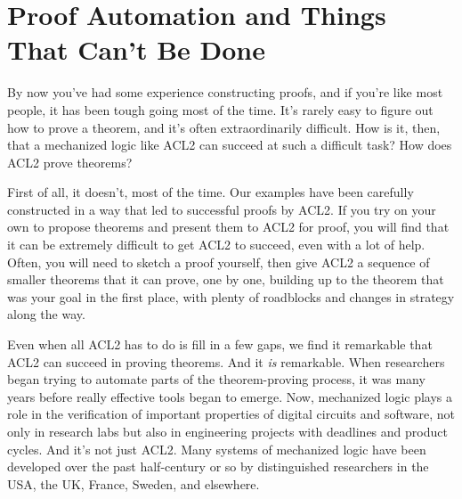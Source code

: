 \begin{exercises}


\end{exercises}

\section{Proof Automation and Things That Can't Be Done}
\label{sec:halting-problem}

By now you've had some experience constructing proofs, and if you're like most people,
it has been tough going most of the time.
It's rarely easy to figure out how to prove a theorem,
and it's often extraordinarily difficult.
How is it, then, that a mechanized logic like ACL2 can succeed at such a difficult task?
How does ACL2 prove theorems?

First of all, it doesn't, most of the time.
Our examples have been carefully constructed in a way that
led to successful proofs by ACL2.
If you try on your own to propose theorems
and present them to ACL2 for proof, you will find that it can be
extremely difficult to get ACL2 to succeed, even with a lot of help.
Often, you will need to sketch a proof yourself,
then give ACL2 a sequence of smaller theorems
that it can prove, one by one, building up to
the theorem that was your goal in the first place,
with plenty of roadblocks and changes in strategy along the way.

Even when all ACL2 has to do is fill in a few gaps,
we find it remarkable that ACL2 can succeed in proving theorems.
And it \emph{is} remarkable.
When researchers began trying to automate parts
of the theorem-proving process, it was many years
before really effective tools began to emerge.
Now, mechanized logic plays a role in
the verification of important properties of digital circuits and
software, not only in research labs
but also in engineering projects with deadlines and product cycles.
And it's not just ACL2. Many systems of mechanized logic %
have been developed over the past half-century or so
by distinguished researchers in the USA, the UK, France, Sweden, and elsewhere.

